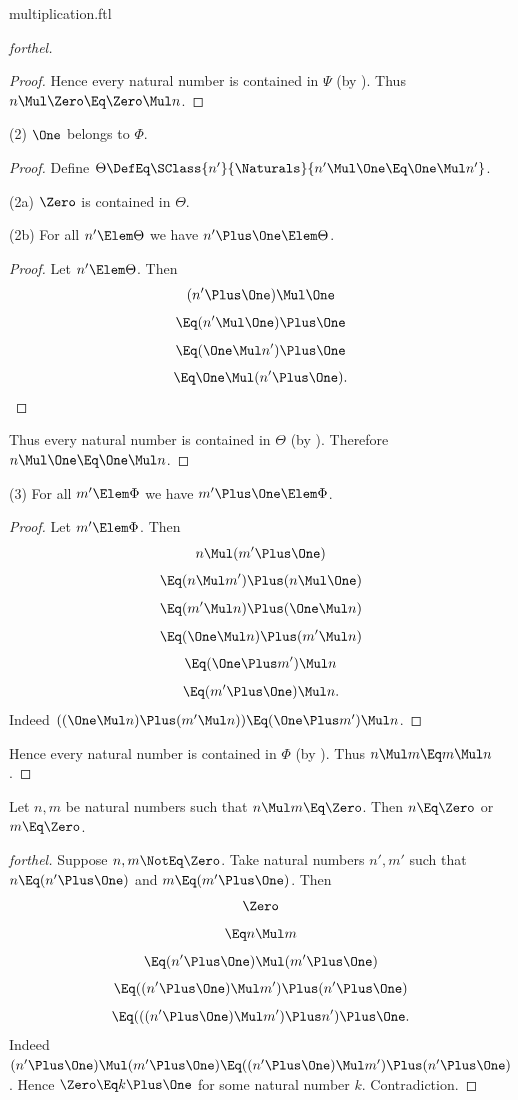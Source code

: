 \documentclass{stex}
\begin{document}
\begin{smodule}{multiplication.ftl}
\begin{proof}[forthel]
\begin{proof}
    Hence every natural number is contained in $\Psi$ (by ).
    Thus $n \Mul \Zero \Eq \Zero \Mul n$.
  \end{proof}

  (2) $\One$ belongs to $\Phi$.
  \begin{proof}
    Define $\Theta \DefEq \SClass{n'}{\Naturals}{n' \Mul \One \Eq \One \Mul n'}$.

    (2a) $\Zero$ is contained in $\Theta$.

    (2b) For all $n' \Elem \Theta$ we have $n' \Plus \One \Elem \Theta$.
    \begin{proof}
      Let $n' \Elem \Theta$.
      Then
      \[  (n' \Plus \One) \Mul \One        \]
      \[    \Eq (n' \Mul \One) \Plus \One    \]
      \[    \Eq (\One \Mul n') \Plus \One    \]
      \[    \Eq \One \Mul (n' \Plus \One).   \]
    \end{proof}

    Thus every natural number is contained in $\Theta$ (by ).
    Therefore $n \Mul \One \Eq \One \Mul n$.
  \end{proof}

  (3) For all $m' \Elem \Phi$ we have $m' \Plus \One \Elem \Phi$.
  \begin{proof}
    Let $m' \Elem \Phi$.
    Then
    \[  n \Mul (m' \Plus \One)                \]
    \[    \Eq (n \Mul m') \Plus (n \Mul \One)  \]
    \[    \Eq (m' \Mul n) \Plus (\One \Mul n)  \]
    \[    \Eq (\One \Mul n) \Plus (m' \Mul n)  \]
    \[    \Eq (\One \Plus m') \Mul n            \]
    \[    \Eq (m' \Plus \One) \Mul n.           \]
    Indeed $((\One \Mul n) \Plus (m' \Mul n)) \Eq (\One \Plus m') \Mul n$. %
  \end{proof}

  Hence every natural number is contained in $\Phi$ (by ).
  Thus $n \Mul m \Eq m \Mul n$.
\end{proof}

\begin{proposition*}[forthel]
  Let $n, m$ be natural numbers such that $n \Mul m \Eq \Zero$.
  Then $n \Eq \Zero$ or $m \Eq \Zero$.
\end{proposition*}
\begin{proof}[forthel]
  Suppose $n, m \NotEq \Zero$.
  Take natural numbers $n', m'$ such that $n \Eq (n' \Plus \One)$ and $m \Eq (m' \Plus \One)$.
  Then
  \[  \Zero                                     \]
  \[    \Eq n \Mul m                         \]
  \[    \Eq (n' \Plus \One) \Mul (m' \Plus \One)           \]
  \[    \Eq ((n' \Plus \One) \Mul m') \Plus (n' \Plus \One)    \]
  \[    \Eq (((n' \Plus \One) \Mul m') \Plus n') \Plus \One.   \]
  Indeed $(n' \Plus \One) \Mul (m' \Plus \One) \Eq ((n' \Plus \One) \Mul m') \Plus (n' \Plus \One)$.
  Hence $\Zero \Eq k \Plus \One$ for some natural number $k$.
  Contradiction.
\end{proof}


\end{smodule}
\end{document}

